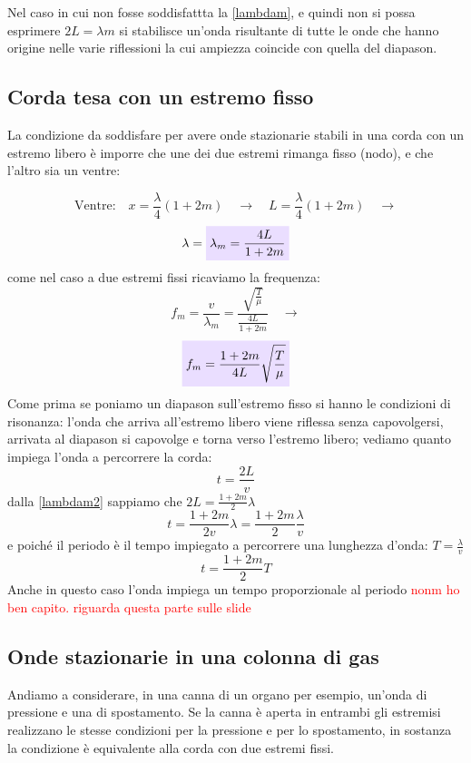 \documentclass[x11names]{report}
\newcommand{\viola}[1]{\colorbox{yred}{$\displaystyle #1$}}
\begin{document}
	Nel caso in cui non fosse soddisfattta la \ref{lambdam}, e quindi non si possa esprimere \(2L = \lambda m\) si stabilisce un'onda risultante di tutte le onde che hanno origine nelle varie riflessioni la cui ampiezza coincide con quella del diapason.
	
	\subsection{Corda tesa con un estremo fisso}
	La condizione da soddisfare per avere onde stazionarie stabili in una corda con un estremo libero è imporre che une dei due estremi rimanga fisso (nodo), e che l'altro sia un ventre:
	
	\[ 
	\text{Ventre:} \quad x = \frac{\lambda}{4}(1+2m) \quad \to \quad L = \frac{\lambda}{4}(1+2m) \quad \to 
	\]
	\begin{equation}\label{lambdam2}
		\lambda = \viola{\lambda_m  = \frac{4L}{1+2m}}
	\end{equation}
	come nel caso a due estremi fissi ricaviamo la frequenza:
	\[ 
	f_m = \frac{v}{\lambda_m} = \frac{\sqrt{\frac{T}{\mu}}}{\frac{4L}{1+2m}} \quad \to
	\]
	\begin{equation}
		\viola{f_m = \frac{1 + 2m}{4L} \sqrt{\frac{T}{\mu}}}
	\end{equation}
	Come prima se poniamo un diapason sull'estremo fisso si hanno le condizioni di risonanza: l'onda che arriva all'estremo libero viene riflessa senza capovolgersi, arrivata al diapason si capovolge e torna verso l'estremo libero; vediamo quanto impiega l'onda a percorrere la corda:
	\[ 
	t = \frac{2L}{v}
	\]
	dalla \ref{lambdam2} sappiamo che \(2L = \frac{1+2m}{2}\lambda\)
	\[ 
	t = \frac{1+2m}{2v}\lambda = \frac{1+2m}{2}\frac{\lambda}{v}
	\]
	e poiché il periodo è il tempo impiegato a percorrere una lunghezza d'onda: \(T=\frac{\lambda}{v}\)
	\[ 
	t = \frac{1+2m}{2}T
	\]
	Anche in questo caso l'onda impiega un tempo proporzionale al periodo \textcolor{red}{nonm ho ben capito. riguarda questa parte sulle slide}
	
	\subsection{Onde stazionarie in una colonna di gas}
	Andiamo a considerare, in una canna di un organo per esempio, un'onda di pressione e una di spostamento. Se la canna è aperta in entrambi gli estremisi realizzano le stesse condizioni per la pressione e per lo spostamento, in sostanza la condizione è equivalente alla corda con due estremi fissi.
	
\end{document}
